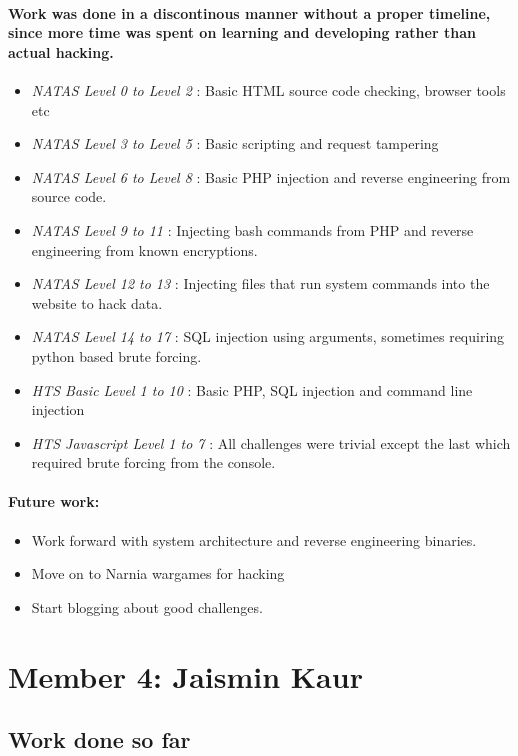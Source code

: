 \documentclass{article}
\begin{document}
\begin{itemize}
\paragraph{Work was done in a discontinous manner without a proper timeline, since more time was spent on learning and developing rather than actual hacking.}
\begin{itemize}
    \item \textit{NATAS Level 0 to Level 2} : Basic HTML source code checking, browser tools etc
    \item \textit{NATAS Level 3 to Level 5} : Basic scripting and request tampering
    \item \textit{NATAS Level 6 to Level 8} : Basic PHP injection and reverse engineering from source code. 
    \item \textit{NATAS Level 9 to 11} : Injecting bash commands from PHP and reverse engineering from known encryptions.
    \item \textit{NATAS Level 12 to 13} :  Injecting files that run system commands into the website to hack data. 
    \item \textit{NATAS Level 14 to 17} : SQL injection using arguments, sometimes requiring python based brute forcing. 
    \item \textit{HTS Basic Level 1 to 10} : Basic PHP, SQL injection and command line injection
    \item \textit{HTS Javascript Level 1 to 7} : All challenges were trivial except the last which required brute forcing from the console. 
\end{itemize}

\paragraph{Future work:}
\begin{itemize}
    \item Work forward with system architecture and reverse engineering binaries.
    \item Move on to Narnia wargames for hacking
    \item Start blogging about good challenges.
\end{itemize}


\newpage
\section*{Member 4: Jaismin Kaur}
\subsection*{Work done so far}

\end{itemize}
\end{document}
